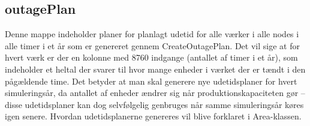 \documentclass{article}
\begin{document}
\subsection{outagePlan}
Denne mappe indeholder planer for planlagt udetid for alle værker i alle nodes i alle timer i et år som er genereret gennem CreateOutagePlan. Det vil sige at for hvert værk er der en kolonne med 8760 indgange (antallet af timer i et år), som indeholder et heltal der svarer til hvor mange enheder i værket der er tændt i den pågældende time. Det betyder at man skal generere nye udetidsplaner for hvert simuleringsår, da antallet af enheder ændrer sig når produktionskapaciteten gør -- disse udetidsplaner kan dog selvfølgelig genbruges når samme simuleringsår køres igen senere. Hvordan udetidsplanerne genereres vil blive forklaret i Area-klassen.
\end{document}
